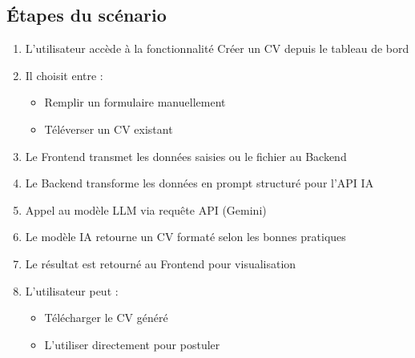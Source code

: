 \subsection*{Étapes du scénario}
\begin{enumerate}
    \item L'utilisateur accède à la fonctionnalité \og Créer un CV \fg{} depuis le tableau de bord
    
    \item Il choisit entre :
    \begin{itemize}
        \item Remplir un formulaire manuellement

                \item Téléverser un CV existant
    \end{itemize}
    \item Le Frontend transmet les données saisies ou le fichier au Backend
    
    \item Le Backend transforme les données en prompt structuré pour l'API IA
    
    \item Appel au modèle LLM via requête API (Gemini)
    
    \item Le modèle IA retourne un CV formaté selon les bonnes pratiques
    
    \item Le résultat est retourné au Frontend pour visualisation
    
    \item L'utilisateur peut :
    \begin{itemize}
        \item Télécharger le CV généré
        \item L'utiliser directement pour postuler
    \end{itemize}
\end{enumerate}

